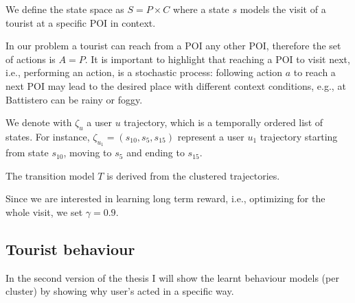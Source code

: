 We define the state space as $S = P \times C $ where a state $s$ models the visit of a tourist at a specific POI in context.

In our problem a tourist can reach from a POI any other POI, therefore the set of actions is $A=P$. It is important to highlight that reaching a POI to visit next, i.e., performing an action, is a stochastic process: following action $a$ to reach a next POI may lead to the desired place with different context conditions, e.g., at Battistero can be rainy or foggy.

We denote with $\zeta_u$ a user $u$ trajectory, which is a temporally ordered list of states. For instance, $\zeta_{u_1} = (s_{10}, s_5, s_{15})$ represent a user $u_1$ trajectory starting from state $s_{10}$, moving to $s_5$ and ending to $s_{15}$.

The transition model $T$ is derived from the clustered trajectories.

Since we are interested in learning long term reward, i.e., optimizing for the whole visit, we set $\gamma=0.9$.


\subsection{Tourist behaviour}
In the second version of the thesis I will show the learnt behaviour models (per cluster) by showing why user's acted in a specific way. 